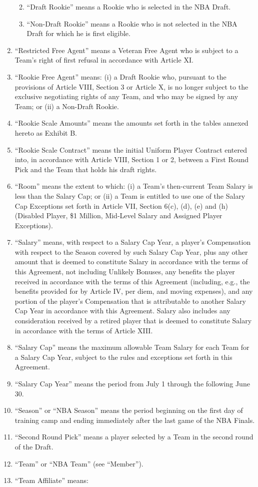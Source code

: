 \documentclass[
]{book}
\providecommand{\tightlist}{%
  \setlength{\itemsep}{0pt}\setlength{\parskip}{0pt}}
\begin{document}
\begin{enumerate}
  \begin{enumerate}
  \def\labelenumii{\arabic{enumii}.}
  \tightlist
  \item
    ``Draft Rookie'' means a Rookie who is selected in the NBA Draft.
  \item
    ``Non-Draft Rookie'' means a Rookie who is not selected in the NBA Draft for which he is first eligible.
  \end{enumerate}
\item
  ``Restricted Free Agent'' means a Veteran Free Agent who is subject to a Team's right of first refusal in accordance with Article XI.
\item
  ``Rookie Free Agent'' means: (i) a Draft Rookie who, pursuant to the provisions of Article VIII, Section 3 or Article X, is no longer subject to the exclusive negotiating rights of any Team, and who may be signed by any Team; or (ii) a Non-Draft Rookie.
\item
  ``Rookie Scale Amounts'' means the amounts set forth in the tables annexed hereto as Exhibit B.
\item
  ``Rookie Scale Contract'' means the initial Uniform Player Contract entered into, in accordance with Article VIII, Section 1 or 2, between a First Round Pick and the Team that holds his draft rights.
\item
  ``Room'' means the extent to which: (i) a Team's then-current Team Salary is less than the Salary Cap; or (ii) a Team is entitled to use one of the Salary Cap Exceptions set forth in Article VII, Section 6(c), (d), (e) and (h) (Disabled Player, \$1 Million, Mid-Level Salary and Assigned Player Exceptions).
\item
  ``Salary'' means, with respect to a Salary Cap Year, a player's Compensation with respect to the Season covered by such Salary Cap Year, plus any other amount that is deemed to constitute Salary in accordance with the terms of this Agreement, not including Unlikely Bonuses, any benefits the player received in accordance with the terms of this Agreement (including, e.g., the benefits provided for by Article IV, per diem, and moving expenses), and any portion of the player's Compensation that is attributable to another Salary Cap Year in accordance with this Agreement. Salary also includes any consideration received by a retired player that is deemed to constitute Salary in accordance with the terms of Article XIII.
\item
  ``Salary Cap'' means the maximum allowable Team Salary for each Team for a Salary Cap Year, subject to the rules and exceptions set forth in this Agreement.
\item
  ``Salary Cap Year'' means the period from July 1 through the following June 30.
\item
  ``Season'' or ``NBA Season'' means the period beginning on the first day of training camp and ending immediately after the last game of the NBA Finals.
\item
  ``Second Round Pick'' means a player selected by a Team in the second round of the Draft.
\item
  ``Team'' or ``NBA Team'' (see ``Member'').
\item
  ``Team Affiliate'' means:


\end{enumerate}
\end{document}
